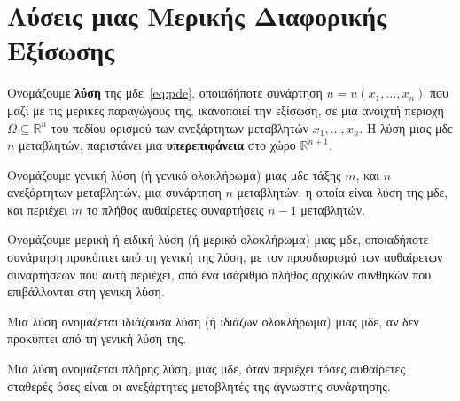 \section*{Λύσεις μιας Μερικής Διαφορικής Εξίσωσης}

\begin{mybox1}
  \begin{dfn}
    Ονομάζουμε \textbf{λύση} της μδε~\eqref{eq:pde}, οποιαδήποτε συνάρτηση 
    $ u=u(x_{1}, \ldots, x_{n}) $ που μαζί με τις μερικές παραγώγους της, 
    ικανοποιεί την εξίσωση, σε μια ανοιχτή περιοχή $ \Omega \subseteq \mathbb{R}^{n} $ 
    του πεδίου ορισμού των ανεξάρτητων μεταβλητών  $ x_{1}, \ldots, x_{n} $.
    Η λύση μιας μδε $n$ μεταβλητών, παριστάνει μια \textbf{υπερεπιφάνεια} στο χώρο 
    $ \mathbb{R}^{n+1} $.
  \end{dfn}
\end{mybox1}

\begin{mybox1}
  \begin{dfn}
    Ονομάζουμε \textcolor{Col1}{γενική λύση (ή γενικό ολοκλήρωμα)} μιας μδε τάξης $m$, 
    και $n$ ανεξάρτητων μεταβλητών, μια συνάρτηση $n$ μεταβλητών, η οποία είναι λύση της 
    μδε, και περιέχει $m$ το πλήθος αυθαίρετες συναρτήσεις $ n-1 $ μεταβλητών.
  \end{dfn}
\end{mybox1}

\begin{mybox1}
  \begin{dfn}
    Ονομάζουμε \textcolor{Col1}{μερική ή ειδική λύση (ή μερικό ολοκλήρωμα)} μιας μδε, 
    οποιαδήποτε συνάρτηση προκύπτει από τη γενική της λύση, με τον προσδιορισμό των 
    αυθαίρετων συναρτήσεων που αυτή περιέχει, από ένα ισάριθμο πλήθος αρχικών συνθηκών 
    που επιβάλλονται στη γενική λύση.
  \end{dfn}
\end{mybox1}

\begin{mybox1}
  \begin{dfn}
    Μια λύση ονομάζεται \textcolor{Col1}{ιδιάζουσα λύση (ή ιδιάζων ολοκλήρωμα)} μιας 
    μδε, αν δεν προκύπτει από τη γενική λύση της.
  \end{dfn}
\end{mybox1}

\begin{mybox1}
  \begin{dfn}
    Μια λύση ονομάζεται πλήρης λύση, μιας μδε, όταν περιέχει τόσες αυθαίρετες 
    σταθερές όσες είναι οι ανεξάρτητες μεταβλητές της άγνωστης συνάρτησης.
  \end{dfn}
\end{mybox1}


